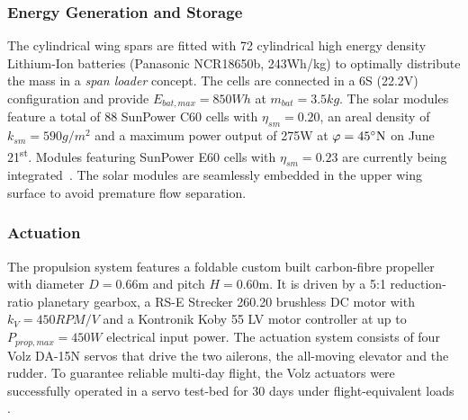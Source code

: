 \subsubsection{Energy Generation and Storage}
The cylindrical wing spars are fitted with 72 cylindrical high energy density Lithium-Ion batteries (Panasonic NCR18650b, 243Wh/kg) to optimally distribute the mass in a \textit{span loader} concept. The cells are connected in a 6S (22.2V) configuration and provide $E_{bat,max}=850Wh$ at $m_{bat}=3.5kg$. The solar modules feature a total of 88 SunPower C60 cells with $\eta_{sm}=0.20$, an areal density of $k_{sm}=590g/m^2$ and a maximum power output of 275W at $\varphi=45\degree \textrm{N}$ on June 21\textsuperscript{st}. Modules featuring SunPower E60 cells with $\eta_{sm}=0.23$ are currently being integrated~\cite{Sunier_EPFLSolarModules}. The solar modules are seamlessly embedded in the upper wing surface to avoid premature flow separation.

\subsubsection{Actuation}
The propulsion system features a foldable custom built carbon-fibre propeller with diameter $D=0.66\textrm{m}$ and pitch $H=0.60\textrm{m}$. It is driven by a 5:1 reduction-ratio planetary gearbox, a RS-E Strecker 260.20 brushless DC motor with $k_V=450RPM/V$ and a Kontronik Koby 55 LV motor controller at up to $P_{prop,max}=450W$ electrical input power. The actuation system consists of four Volz DA-15N servos that drive the two ailerons, the all-moving elevator and the rudder. To guarantee reliable multi-day flight, the Volz actuators were successfully operated in a servo test-bed for 30 days under flight-equivalent loads \cite{DellaCa_BT}.

